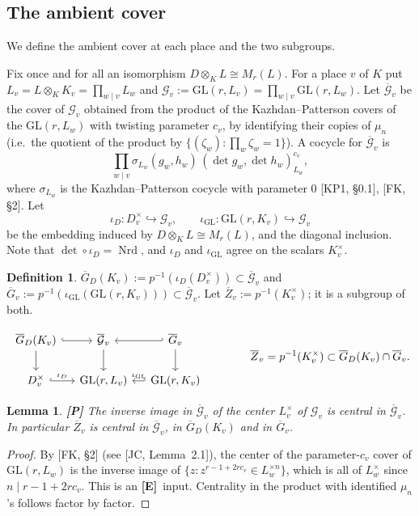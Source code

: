 \documentclass[12pt]{article}
\newcommand{\ov}[1]{\overline{#1}}
\newcommand{\Nrd}{\operatorname{Nrd}}
\newcommand{\GL}{\mathrm{GL}}
\newcommand{\Gb}{\ov{G}}
\newcommand{\Zb}{\ov{Z}}
\newcommand{\GDb}{\ov{G}_D}
\newcommand{\cG}{\mathcal{G}}
\newcommand{\cGb}{\ov{\mathcal{G}}}
\newcommand{\iD}{\iota_D}
\newcommand{\iG}{\iota_{\GL}}
\newcommand{\Pv}{\textbf{[P]}}
\newcommand{\Ev}{\textbf{[E]}}
\theoremstyle{plain}
\newtheorem{lemma}[theorem]{Lemma}
\theoremstyle{definition}
\newtheorem{definition}[theorem]{Definition}
\begin{document}
\subsection{The ambient cover}\label{subsec:ambient}
We define the ambient cover at each place and the two subgroups.

Fix once and for all an isomorphism $D\otimes_KL\cong M_r(L)$. For a place $v$ of $K$ put $L_v=L\otimes_KK_v=\prod_{w\mid v}L_w$ and $\cG_v:=\GL(r,L_v)=\prod_{w\mid v}\GL(r,L_w)$. Let $\cGb_v$ be the cover of $\cG_v$ obtained from the product of the Kazhdan--Patterson covers of the $\GL(r,L_w)$ with twisting parameter $c_v$, by identifying their copies of $\mu_n$ (i.e.\ the quotient of the product by $\{(\zeta_w):\prod_w\zeta_w=1\}$). A cocycle for $\cGb_v$ is
\begin{equation}\label{eq:ambient}
\prod_{w\mid v}\sigma_{L_w}(g_w,h_w)\,(\det g_w,\det h_w)_{L_w}^{c_v},
\end{equation}
where $\sigma_{L_w}$ is the Kazhdan--Patterson cocycle with parameter $0$ [KP1, \S0.1], [FK, \S2]. Let
\[ \iD:D_v^\times\hookrightarrow\cG_v,\qquad \iG:\GL(r,K_v)\hookrightarrow\cG_v \]
be the embedding induced by $D\otimes_KL\cong M_r(L)$, and the diagonal inclusion. Note that $\det\circ\iD=\Nrd$, and $\iD$ and $\iG$ agree on the scalars $K_v^\times$.

\begin{definition}\label{def:localcovers}
$\GDb(K_v):=p^{-1}(\iD(D_v^\times))\subset\cGb_v$ and $\Gb_v:=p^{-1}(\iG(\GL(r,K_v)))\subset\cGb_v$. Let $\Zb_v:=p^{-1}(K_v^\times)$; it is a subgroup of both.
\end{definition}

\begin{equation}\label{eq:diagram}
\begin{tikzcd}[column sep=small]
\GDb(K_v)\arrow[r,hook]\arrow[d] & \cGb_v\arrow[d] & \Gb_v\arrow[l,hook']\arrow[d]\\
D_v^\times\arrow[r,hook,"\iD"] & \GL(r,L_v) & \GL(r,K_v)\arrow[l,hook',"\iG"']
\end{tikzcd}
\qquad\qquad \Zb_v=p^{-1}(K_v^\times)\subset\GDb(K_v)\cap\Gb_v.
\end{equation}

\begin{lemma}\label{lem:center}\Pv
The inverse image in $\cGb_v$ of the center $L_v^\times$ of $\cG_v$ is central in $\cGb_v$. In particular $\Zb_v$ is central in $\cGb_v$, in $\GDb(K_v)$ and in $\Gb_v$.
\end{lemma}
\begin{proof}
By [FK, \S2] (see [JC, Lemma~2.1]), the center of the parameter-$c_v$ cover of $\GL(r,L_w)$ is the inverse image of $\{z:z^{r-1+2rc_v}\in L_w^{\times n}\}$, which is all of $L_w^\times$ since $n\mid r-1+2rc_v$. This is an \Ev\ input. Centrality in the product with identified $\mu_n$'s follows factor by factor.
\end{proof}
\end{document}
